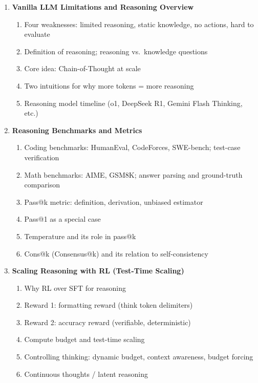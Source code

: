 \documentclass[11pt, a4paper]{article}
\begin{document}
\begin{enumerate}[label=\textbf{\arabic*.}, leftmargin=2em]
  \item \textbf{Vanilla LLM Limitations and Reasoning Overview}
    \begin{enumerate}[label=\arabic{enumi}.\arabic*]
      \item Four weaknesses: limited reasoning, static knowledge, no actions, hard to evaluate
      \item Definition of reasoning; reasoning vs.\ knowledge questions
      \item Core idea: Chain-of-Thought at scale
      \item Two intuitions for why more tokens = more reasoning
      \item Reasoning model timeline (o1, DeepSeek R1, Gemini Flash Thinking, etc.)
    \end{enumerate}

  \item \textbf{Reasoning Benchmarks and Metrics}
    \begin{enumerate}[label=\arabic{enumi}.\arabic*]
      \item Coding benchmarks: HumanEval, CodeForces, SWE-bench; test-case verification
      \item Math benchmarks: AIME, GSM8K; answer parsing and ground-truth comparison
      \item Pass@k metric: definition, derivation, unbiased estimator
      \item Pass@1 as a special case
      \item Temperature and its role in pass@k
      \item Cons@k (Consensus@k) and its relation to self-consistency
    \end{enumerate}

  \item \textbf{Scaling Reasoning with RL (Test-Time Scaling)}
    \begin{enumerate}[label=\arabic{enumi}.\arabic*]
      \item Why RL over SFT for reasoning
      \item Reward 1: formatting reward (think token delimiters)
      \item Reward 2: accuracy reward (verifiable, deterministic)
      \item Compute budget and test-time scaling
      \item Controlling thinking: dynamic budget, context awareness, budget forcing
      \item Continuous thoughts / latent reasoning
    \end{enumerate}


\end{enumerate}
\end{document}
